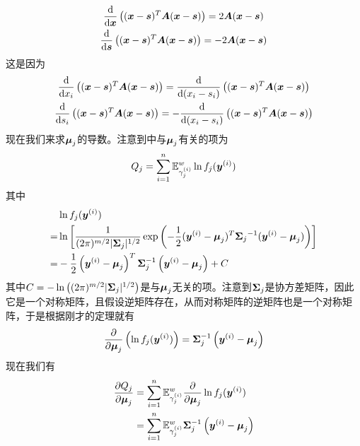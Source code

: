 \documentclass[a4paper,UTF8]{article}
\begin{document}
\begin{itemize}
\begin{gather*}
    \frac{\intd}{\intd\myvec{x}}\left((\myvec{x}-\myvec{s})^T\myvec{A}(\myvec{x}-\myvec{s})\right)=2\myvec{A}(\myvec{x}-\myvec{s})\\
    \frac{\intd}{\intd\myvec{s}}\left((\myvec{x}-\myvec{s})^T\myvec{A}(\myvec{x}-\myvec{s})\right)=-2\myvec{A}(\myvec{x}-\myvec{s})
\end{gather*}这是因为\begin{gather*}
    \frac{\intd}{\intd x_i}\left((\myvec{x}-\myvec{s})^T\myvec{A}(\myvec{x}-\myvec{s})\right)=\frac{\intd}{\intd (x_i-s_i)}\left((\myvec{x}-\myvec{s})^T\myvec{A}(\myvec{x}-\myvec{s})\right)\\
    \frac{\intd}{\intd s_i}\left((\myvec{x}-\myvec{s})^T\myvec{A}(\myvec{x}-\myvec{s})\right)=-\frac{\intd}{\intd (x_i-s_i)}\left((\myvec{x}-\myvec{s})^T\myvec{A}(\myvec{x}-\myvec{s})\right)
\end{gather*}现在我们来求\(\myvec{\mu}_j\)的导数。注意到中与\(\myvec{\mu}_j\)有关的项为\begin{equation}
    Q_j=\sum_{i=1}^n\expectation_{\gamma_j^{(i)}}^w\ln f_j(\myvec{y}^{(i)})
\end{equation}其中\begin{equation*}
    \begin{split}
        &\ln f_j(\myvec{y}^{(i)})\\
        =&\ln\left[
            \ngaussiandistvar[m]{\myvec{y}^{(i)}}{\myvec{\mu}_j}{\myvec{\Sigma}_j}
        \right]\\
        =&-\frac{1}{2}\left(\myvec{y}^{(i)}-\myvec{\mu}_j\right)^T\myvec{\Sigma}^{-1}_j\left(\myvec{y}^{(i)}-\myvec{\mu}_j\right)+C
    \end{split}
\end{equation*}其中\(C=-\ln\left((2\pi)^{m/2}|\myvec{\Sigma}_j|^{1/2}\right)\)是与\(\myvec{\mu}_j\)无关的项。注意到\(\myvec{\Sigma}_j\)是协方差矩阵，因此它是一个对称矩阵，且假设逆矩阵存在，从而对称矩阵的逆矩阵也是一个对称矩阵，于是根据刚才的定理就有\begin{equation}
    \frac{\partial}{\partial \myvec{\mu}_j}\left(\ln f_j(\myvec{y}^{(i)})\right)=\myvec{\Sigma}_j^{-1}\left(\myvec{y}^{(i)}-\myvec{\mu}_j\right)
\end{equation}现在我们有\begin{equation}
    \begin{split}
        \frac{\partial Q_j}{\partial \myvec{\mu}_j}
        &=\sum_{i=1}^n \expectation_{\gamma_j^{(i)}}^w\frac{\partial}{\partial\myvec{\mu}_j}\ln f_j(\myvec{y}^{(i)})\\
        &=\sum_{i=1}^n \expectation_{\gamma_j^{(i)}}^w\myvec{\Sigma}_j^{-1}\left(\myvec{y}^{(i)}-\myvec{\mu}_j\right)\\

\end{split}
\end{equation}
\end{itemize}
\end{document}
